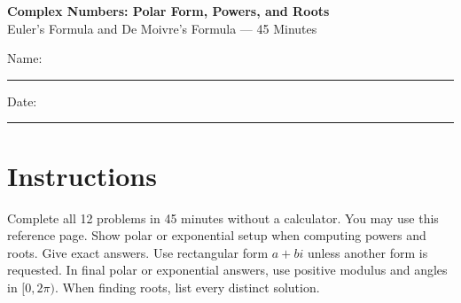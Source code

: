 \documentclass[11pt]{article}
\begin{document}
\begin{center}
  {\Large\textbf{Complex Numbers: Polar Form, Powers, and Roots}}\\[3pt]
  {\large Euler's Formula and De Moivre's Formula --- 45 Minutes}
\end{center}

Name: \rule{2.7in}{0.4pt}\hfill Date: \rule{1.5in}{0.4pt}

\section*{Instructions}
Complete all 12 problems in 45 minutes without a calculator. You may use this
reference page. Show polar or exponential setup when computing powers and
roots. Give exact answers. Use rectangular form $a+bi$ unless another form is
requested. In final polar or exponential answers, use positive modulus and
angles in $[0,2\pi)$. When finding roots, list every distinct solution.
\end{document}
